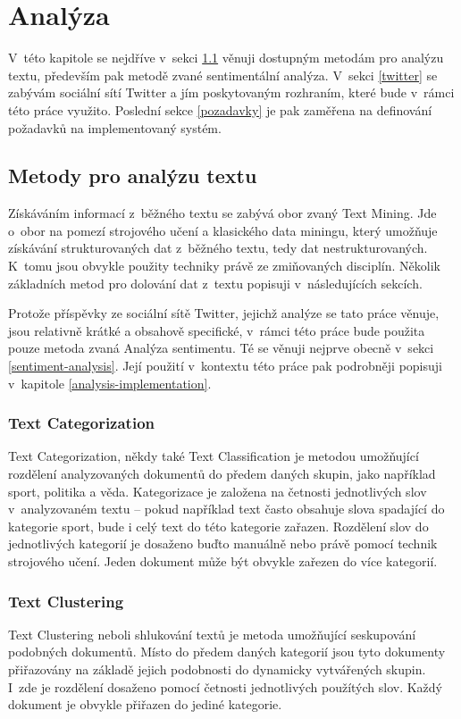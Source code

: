 \documentclass[thesis=B,czech]{FITthesis}[2012/06/26]
\begin{document}
\chapter{Analýza}
V~této kapitole se nejdříve v~sekci \ref{text-mining} věnuji dostupným metodám pro analýzu textu, především pak metodě zvané sentimentální analýza. V~sekci \ref{twitter} se zabývám sociální sítí Twitter a jím poskytovaným rozhraním, které bude v~rámci této práce využito. Poslední sekce \ref{pozadavky} je pak zaměřena na definování požadavků na implementovaný systém. 


\section{Metody pro analýzu textu}
\label{text-mining}
	Získáváním informací z~běžného textu se zabývá obor zvaný Text Mining. Jde o~obor na pomezí strojového učení a klasického data miningu, který umožňuje získávání strukturovaných dat z~běžného textu, tedy dat nestrukturovaných. K~tomu jsou obvykle použity techniky právě ze zmiňovaných disciplín. Několik základních metod pro dolování dat z~textu popisuji v~následujících sekcích. 
	
	Protože příspěvky ze sociální sítě Twitter, jejichž analýze se tato práce věnuje, jsou relativně krátké a obsahově specifické, v~rámci této práce bude použita pouze metoda zvaná Analýza sentimentu. Té se věnuji nejprve obecně v~sekci \ref{sentiment-analysis}. Její použití v~kontextu této práce pak podrobněji popisuji v~kapitole \ref{analysis-implementation}. 
	
\subsection{Text Categorization}
	Text Categorization, někdy také Text Classification je metodou umožňující rozdělení analyzovaných dokumentů do předem daných skupin, jako například sport, politika a věda. Kategorizace je založena na četnosti jednotlivých slov v~analyzovaném textu -- pokud například text často obsahuje slova spadající do kategorie sport, bude i celý text do této kategorie zařazen. Rozdělení slov do jednotlivých kategorií je dosaženo buďto manuálně nebo právě pomocí technik strojového učení. Jeden dokument může být obvykle zařezen do více kategorií. 

\subsection{Text Clustering}
	Text Clustering neboli shlukování textů je metoda umožňující seskupování podobných dokumentů. Místo do předem daných kategorií jsou tyto dokumenty přiřazovány na základě jejich podobnosti do dynamicky vytvářených skupin. I~zde je rozdělení dosaženo pomocí četnosti jednotlivých použítých slov. Každý dokument je obvykle přiřazen do jediné kategorie. 
\end{document}
